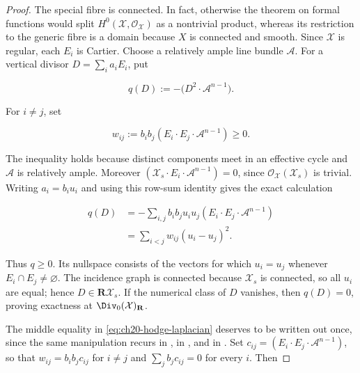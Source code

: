 \begin{proof}
The special fibre is connected.  In fact, otherwise the theorem on formal
functions would split \(H^0(\mathcal X,\mathcal O_{\mathcal X})\) as a
nontrivial product, whereas its restriction to the generic fibre is a domain
because \(X\) is connected and smooth.  Since \(\mathcal X\) is regular,
each \(E_i\) is Cartier.  Choose a relatively ample line bundle
\(\mathcal A\).  For a vertical divisor \(D=\sum_i a_iE_i\), put

\begin{equation}
\label{eq:ch20-hodge-quadratic}
 q(D):=-\bigl(D^2\cdot\mathcal A^{n-1}\bigr).
\end{equation}

For \(i\ne j\), set

\begin{equation}
\label{eq:ch20-edge-weights}
 w_{ij}:=b_ib_j(E_i\cdot E_j\cdot\mathcal A^{n-1})\geq0.
\end{equation}

The inequality holds because distinct components meet in an effective
cycle and \(\mathcal A\) is relatively ample.  Moreover
\((\mathcal X_s\cdot E_i\cdot\mathcal A^{n-1})=0\), since
\(\mathcal O_{\mathcal X}(\mathcal X_s)\) is trivial.  Writing
\(a_i=b_iu_i\) and using this row-sum identity gives the exact calculation

\begin{equation}
\label{eq:ch20-hodge-laplacian}
 \begin{aligned}
 q(D)
  &=-\sum_{i,j}b_ib_ju_iu_j
       (E_i\cdot E_j\cdot\mathcal A^{n-1})\\
  &=\sum_{i<j}w_{ij}(u_i-u_j)^2.
 \end{aligned}
\end{equation}

Thus \(q\geq0\).  Its nullspace consists of the vectors for which
\(u_i=u_j\) whenever \(E_i\cap E_j\ne\varnothing\).  The incidence graph is
connected because \(\mathcal X_s\) is connected, so all \(u_i\) are equal;
hence \(D\in\mathbf R\mathcal X_s\).  If the numerical class of \(D\)
vanishes, then \(q(D)=0\), proving exactness at
\(\Div_0(\mathcal X)_{\mathbf R}\).

The middle equality in \eqref{eq:ch20-hodge-laplacian} deserves to be
written out once, since the same manipulation recurs in
, in
, and in
.  Set \(c_{ij}=(E_i\cdot E_j\cdot\mathcal A^{n-1})\),
so that \(w_{ij}=b_ib_jc_{ij}\) for \(i\ne j\) and
\(\sum_jb_jc_{ij}=0\) for every \(i\).  Then


\end{proof}
